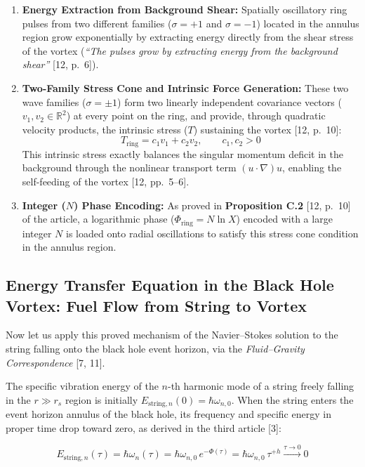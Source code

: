 \documentclass[12pt,a4paper]{article}
\begin{document}
\begin{enumerate}
    \item \textbf{Energy Extraction from Background Shear:} Spatially oscillatory ring pulses from two different families ($\sigma = +1$ and $\sigma = -1$) located in the annulus region grow exponentially by extracting energy directly from the shear stress of the vortex (\textit{``The pulses grow by extracting energy from the background shear''} [12, p.\ 6]).
    \item \textbf{Two-Family Stress Cone and Intrinsic Force Generation:} These two wave families ($\sigma = \pm 1$) form two linearly independent covariance vectors ($v_1, v_2 \in \mathbb{R}^2$) at every point on the ring, and provide, through quadratic velocity products, the intrinsic stress ($T$) sustaining the vortex [12, p.\ 10]:
    \begin{equation}
    T_{\text{ring}} = c_1 v_1 + c_2 v_2, \qquad c_1, c_2 > 0
    \end{equation}
    This intrinsic stress exactly balances the singular momentum deficit in the background through the nonlinear transport term $(u \cdot \nabla)u$, enabling the self-feeding of the vortex [12, pp.\ 5--6].
    \item \textbf{Integer ($N$) Phase Encoding:} As proved in \textbf{Proposition C.2} [12, p.\ 10] of the article, a logarithmic phase ($\Phi_{\text{ring}} = N \ln X$) encoded with a large integer $N$ is loaded onto radial oscillations to satisfy this stress cone condition in the annulus region.
\end{enumerate}

\subsection{Energy Transfer Equation in the Black Hole Vortex: Fuel Flow from String to Vortex}

Now let us apply this proved mechanism of the Navier--Stokes solution to the string falling onto the black hole event horizon, via the \textit{Fluid--Gravity Correspondence} [7, 11].

The specific vibration energy of the $n$-th harmonic mode of a string freely falling in the $r \gg r_s$ region is initially $E_{\text{string}, n}(0) = \hbar \omega_{n,0}$. When the string enters the event horizon annulus of the black hole, its frequency and specific energy in proper time drop toward zero, as derived in the third article [3]:

\begin{equation}
E_{\text{string}, n}(\tau) = \hbar \omega_n(\tau) = \hbar \omega_{n,0} \, e^{-\Phi(\tau)} = \hbar \omega_{n,0} \, \tau^{+h} \xrightarrow{\tau \to 0} 0
\end{equation}
\end{document}
